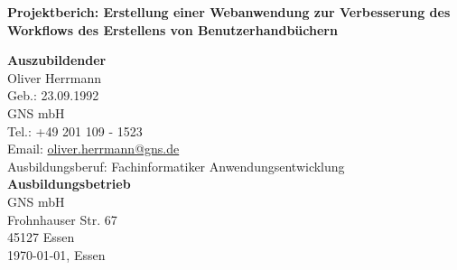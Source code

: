 \newcommand{\Projekt}{Erstellung einer Webanwendung
		zur Verbesserung des Workflows des Erstellens von Benutzerhandbüchern}

\thispagestyle{empty}

\begin{center}
	\huge \bfseries
	Projektberich: \Projekt \\[4cm]

	\Large	\mdseries

	\textbf{Auszubildender} \\
	Oliver Herrmann \\
	Geb.: 23.09.1992 \\
	GNS mbH \\
	Tel.: +49 201 109 - 1523 \\
	Email: \href{mailto:oliver.herrmann@gns.de}{oliver.herrmann@gns.de}  \\
	Ausbildungsberuf: Fachinformatiker Anwendungsentwicklung \\[2cm]

	\textbf{Ausbildungsbetrieb} \\
	GNS mbH \\
	Frohnhauser Str. 67 \\
	45127 Essen \\[3cm]

	\today, Essen
\end{center}


